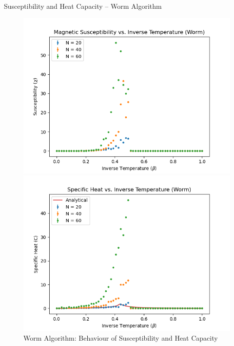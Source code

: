 \documentclass{beamer}
\begin{document}
\begin{frame}{Susceptibility and Heat Capacity – Worm Algorithm}
    \begin{figure}[htbp]
	\begin{center}
		\begin{minipage}[t]{0.49\linewidth}
			\centering
			\includegraphics[width=\linewidth]{worm_suscep.png}
		\end{minipage}
		\begin{minipage}[t]{0.49\linewidth}
			\centering
			\includegraphics[width=\linewidth]{worm_heat_1.png}
		\end{minipage}
        \caption{Worm Algorithm: Behaviour of Susceptibility and Heat Capacity}
	\end{center}
    \end{figure}
\end{frame}
\end{document}
